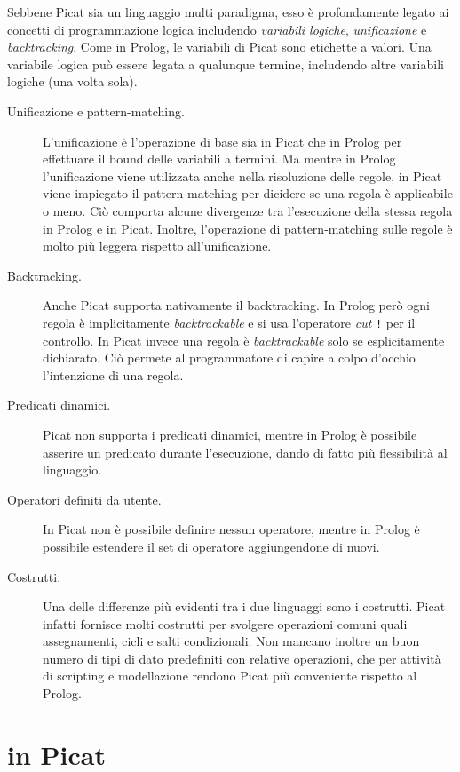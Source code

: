\documentclass[12pt,a4paper,openright]{book} %
\begin{document}
Sebbene Picat sia un linguaggio multi paradigma, esso è profondamente legato ai concetti di programmazione logica includendo \emph{variabili logiche}, \emph{unificazione} e \emph{backtracking}.
Come in Prolog, le variabili di Picat sono etichette a valori. Una variabile logica può essere legata a qualunque termine, includendo altre variabili logiche (una volta sola).

\begin{description}
\item[Unificazione e pattern-matching.] L'unificazione è l'operazione di base sia in Picat che in Prolog per effettuare il bound delle variabili a termini. Ma mentre in Prolog l'unificazione viene utilizzata anche nella risoluzione delle regole, in Picat viene impiegato il pattern-matching per dicidere se una regola è applicabile o meno. Ciò comporta alcune divergenze tra l'esecuzione della stessa regola in Prolog e in Picat.
Inoltre, l'operazione di pattern-matching sulle regole è molto più leggera rispetto all'unificazione.
\item[Backtracking.] Anche Picat supporta nativamente il backtracking. In Prolog però ogni regola è implicitamente \emph{backtrackable} e si usa l'operatore \emph{cut} \verb|!| per il controllo. In Picat invece una regola è \emph{backtrackable} solo se esplicitamente dichiarato. Ciò permete al programmatore di capire a colpo d'occhio l'intenzione di una regola.
\item[Predicati dinamici.] Picat non supporta i predicati dinamici, mentre in Prolog è possibile asserire un predicato durante l'esecuzione, dando di fatto più flessibilità al linguaggio.
\item[Operatori definiti da utente.] In Picat non è possibile definire nessun operatore, mentre in Prolog è possibile estendere il set di operatore aggiungendone di nuovi.
\item[Costrutti.] Una delle differenze più evidenti tra i due linguaggi sono i costrutti. Picat infatti fornisce molti costrutti per svolgere operazioni comuni quali assegnamenti, cicli e salti condizionali. Non mancano inoltre un buon numero di tipi di dato predefiniti con relative operazioni, che per attività di scripting e modellazione rendono Picat più conveniente rispetto al Prolog.
\end{description}


\chapter{\lset{} in Picat}
\label{ch:lsetpicat}
\end{document}
